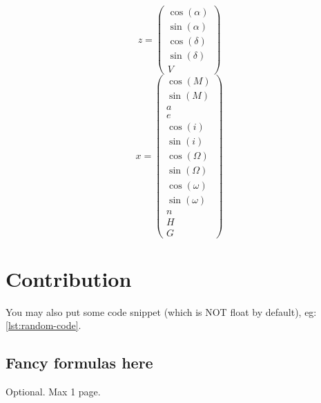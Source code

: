 \documentclass[12pt,a4paper,openright,twoside]{book}
\begin{document}
\begin{equation}
z=\begin{pmatrix}
\cos(\alpha) \\
\sin(\alpha) \\
\cos(\delta) \\
\sin(\delta) \\
V
\end{pmatrix}
\end{equation}
\begin{equation}
x=\begin{pmatrix}
\cos(M) \\
\sin(M) \\
a \\
e \\
\cos(i) \\
\sin(i) \\
\cos(\Omega) \\
\sin(\Omega) \\
\cos(\omega) \\
\sin(\omega) \\
n \\
H \\
G
\end{pmatrix}
\end{equation}

\chapter{Contribution}

You may also put some code snippet (which is NOT float by default), eg: \cref{lst:random-code}.



\section{Fancy formulas here}


\backmatter


% 



\begin{acknowledgements} %
Optional. Max 1 page.
\end{acknowledgements}
\end{document}

